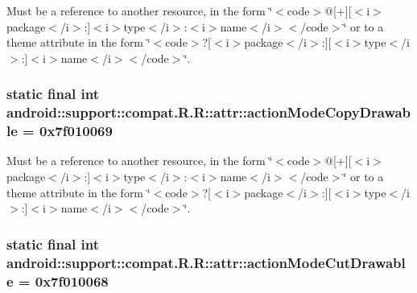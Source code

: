 Must be a reference to another resource, in the form \char`\"{}$<$code$>$@\mbox{[}+\mbox{]}\mbox{[}$<$i$>$package$<$/i$>$:\mbox{]}$<$i$>$type$<$/i$>$:$<$i$>$name$<$/i$>$$<$/code$>$\char`\"{} or to a theme attribute in the form \char`\"{}$<$code$>$?\mbox{[}$<$i$>$package$<$/i$>$:\mbox{]}\mbox{[}$<$i$>$type$<$/i$>$:\mbox{]}$<$i$>$name$<$/i$>$$<$/code$>$\char`\"{}. \hypertarget{classandroid_1_1support_1_1compat_1_1_r_1_1attr_2574dc001586ffa307ec3075c8d55a49}{
\subsubsection[{actionModeCopyDrawable}]{\setlength{\rightskip}{0pt plus 5cm}static final int android::support::compat.R.R::attr::actionModeCopyDrawable = 0x7f010069}}
\label{classandroid_1_1support_1_1compat_1_1_r_1_1attr_2574dc001586ffa307ec3075c8d55a49}


Must be a reference to another resource, in the form \char`\"{}$<$code$>$@\mbox{[}+\mbox{]}\mbox{[}$<$i$>$package$<$/i$>$:\mbox{]}$<$i$>$type$<$/i$>$:$<$i$>$name$<$/i$>$$<$/code$>$\char`\"{} or to a theme attribute in the form \char`\"{}$<$code$>$?\mbox{[}$<$i$>$package$<$/i$>$:\mbox{]}\mbox{[}$<$i$>$type$<$/i$>$:\mbox{]}$<$i$>$name$<$/i$>$$<$/code$>$\char`\"{}. \hypertarget{classandroid_1_1support_1_1compat_1_1_r_1_1attr_b49e4f86f95b1afc2ec7406835369821}{
\subsubsection[{actionModeCutDrawable}]{\setlength{\rightskip}{0pt plus 5cm}static final int android::support::compat.R.R::attr::actionModeCutDrawable = 0x7f010068}}
\label{classandroid_1_1support_1_1compat_1_1_r_1_1attr_b49e4f86f95b1afc2ec7406835369821}


